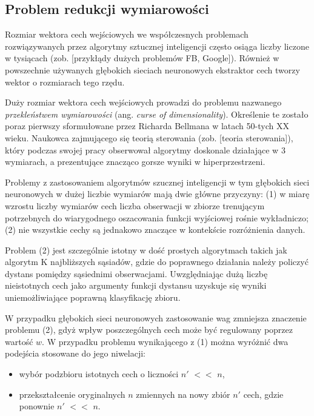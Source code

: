\subsection{Problem redukcji wymiarowości}

Rozmiar wektora cech wejściowych we współczesnych problemach rozwiązywanych przez algorytmy sztucznej inteligencji często osiąga liczby liczone w tysiącach (zob. [przykłądy dużych problemów FB, Google]). Również w powszechnie używanych głębokich sieciach neuronowych ekstraktor cech tworzy wektor o rozmiarach tego rzędu.

Duży rozmiar wektora cech wejściowych prowadzi do problemu nazwanego \textit{przekleństwem wymiarowości} (ang. \textit{curse of dimensionality}). Określenie te zostało poraz pierwszy sformułowane przez Richarda Bellmana w latach 50-tych XX wieku. Naukowca zajmującego się teorią sterowania (zob. [teoria sterowania]), który podczas swojej pracy obserwował algorytmy doskonale działające w 3 wymiarach, a prezentujące znacząco gorsze wyniki w hiperprzestrzeni. 

Problemy z zastosowaniem algorytmów szucznej inteligencji w tym głębokich sieci neuronowych w dużej liczbie wymiarów mają dwie główne przyczyny: (1) w miarę wzrostu liczby wymiarów cech liczba obserwacji w zbiorze trenującym potrzebnych do wiarygodnego oszacowania funkcji wyjściowej rośnie wykładniczo; (2) nie wszystkie cechy są jednakowo znaczące w kontekście rozróżnienia danych.  

Problem (2) jest szczególnie istotny w dość prostych algorytmach takich jak algorytm K najbliższych sąsiadów, gdzie do poprawnego działania należy policzyć dystans pomiędzy sąsiednimi obserwacjami. Uwzględniając dużą liczbę nieistotnych cech jako argumenty funkcji dystansu uzyskuje się wyniki uniemożliwiające poprawną klasyfikację zbioru. 

W przypadku głębokich sieci neuronowych zastosowanie wag zmniejsza znaczenie problemu (2), gdyż wpływ poszczególnych cech może być regulowany poprzez wartość $w$. W przypadku problemu wynikającego z (1) można wyróżnić dwa podejścia stosowane do jego niwelacji:
\begin{itemize}
\item wybór podzbioru istotnych cech o liczności $n'$ $<<$ $n$,
\item przekształcenie oryginalnych $n$ zmiennych na nowy zbiór $n'$ cech, gdzie ponownie $n'$ $<<$ $n$.

\end{itemize}

